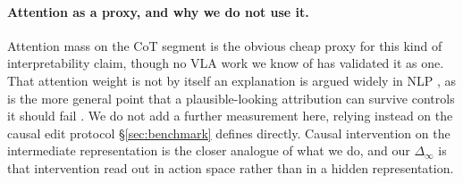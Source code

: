 \documentclass{article}
\begin{document}
\paragraph{Attention as a proxy, and why we do not use it.} Attention mass on the CoT segment is the obvious cheap proxy for this kind of interpretability claim, though no VLA work we know of has validated it as one. That attention weight is not by itself an explanation is argued widely in NLP \citep{jain2019attention,serrano2019}, as is the more general point that a plausible-looking attribution can survive controls it should fail \citep{adebayo2018,friedman2024}. We do not add a further measurement here, relying instead on the causal edit protocol \S\ref{sec:benchmark} defines directly. Causal intervention on the intermediate representation \citep{rome,zhang2024patching,geiger2022das} is the closer analogue of what we do, and our $\Delta_\infty$ is that intervention read out in action space rather than in a hidden representation.
\end{document}
